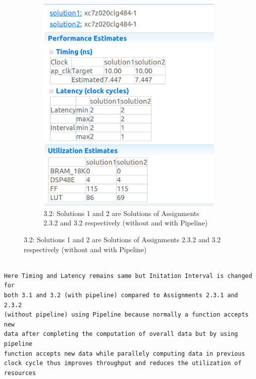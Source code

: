 \documentclass{article}
\begin{document}
\begin{figure}[h]
\begin{subfigure}[b]{0.6\textwidth}
\includegraphics[width=\textwidth]{figs/352.png}
    \caption{3.2: Solutions 1 and 2 are Solutions of Assignments 2.3.2 and 3.2 respectively (without and with Pipeline)}
    \label{fig:my_label}
\end{subfigure}
\end{figure}
\begin{lstlisting}

Here Timing and Latency remains same but Initation Interval is changed for
both 3.1 and 3.2 (with pipeline) compared to Assignments 2.3.1 and 2.3.2
(without pipeline) using Pipeline because normally a function accepts new 
data after completing the computation of overall data but by using pipeline
function accepts new data while parallely computing data in previous 
clock cycle thus improves throughput and reduces the utilization of resources 

\end{lstlisting}
\end{document}
